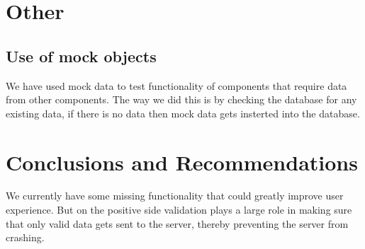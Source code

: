 \documentclass[11pt,fleqn]{book} %
\begin{document}


\chapter{Other}
	\section{Use of mock objects}
	We have used mock data to test functionality of components that require data from other components. The way we did this is by checking the database for any existing data, if there is no data then mock data gets insterted into the database.


\chapter{Conclusions and Recommendations}
We currently have some missing functionality that could greatly improve user experience. But on the positive side validation plays a large role in making sure that only valid data gets sent to the server, thereby preventing the server from crashing.
\end{document}
